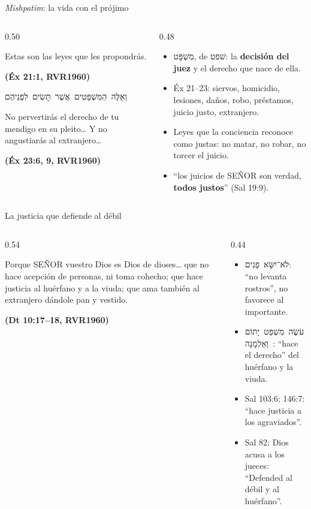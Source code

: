 \documentclass[hyperref={bookmarks=false},aspectratio=169]{beamer}
\newcommand{\heb}[1]{\mbox{\foreignlanguage{hebrew}{#1}}}
\newcommand{\SENOR}{S{\fontsize{0.78em}{1em}\selectfont EÑOR}}
\newcommand{\fuente}[1]{\par\hfill{\upshape\bfseries\footnotesize\textcolor{azul}{#1}}}
\newcommand{\destacar}[1]{\textbf{\textcolor{azul}{#1}}}
\begin{document}
\begin{frame}{\emph{Mishpatim}: la vida con el prójimo}
\begin{columns}[c,onlytextwidth]
\begin{column}{0.50\textwidth}
\begin{cita}Estas son las leyes que les propondrás.\fuente{(Éx 21:1, RVR1960)}\end{cita}
\begin{center}\heb{וְאֵלֶּה הַמִּשְׁפָּטִים אֲשֶׁר תָּשִׂים לִפְנֵיהֶם}\end{center}
\begin{cita}No pervertirás el derecho de tu mendigo en su pleito\ldots{} Y no angustiarás al extranjero\ldots\fuente{(Éx 23:6, 9, RVR1960)}\end{cita}
\end{column}
\begin{column}{0.48\textwidth}\small
\begin{itemize}
\item \heb{מִשְׁפָּט}, de \heb{שׁפט}: la \destacar{decisión del juez} y el derecho que nace de ella.
\item Éx 21--23: siervos, homicidio, lesiones, daños, robo, préstamos, juicio justo, extranjero.
\item Leyes que la conciencia reconoce como justas: no matar, no robar, no torcer el juicio.
\item ``los juicios de \SENOR{} son verdad, \destacar{todos justos}'' (Sal 19:9).
\end{itemize}
\end{column}
\end{columns}
\end{frame}

\begin{frame}{La justicia que defiende al débil}
\begin{columns}[c,onlytextwidth]
\begin{column}{0.54\textwidth}
\begin{cita}Porque \SENOR{} vuestro Dios es Dios de dioses\ldots{} que no hace acepción de personas, ni toma cohecho; que hace justicia al huérfano y a la viuda; que ama también al extranjero dándole pan y vestido.\fuente{(Dt 10:17--18, RVR1960)}\end{cita}
\end{column}
\begin{column}{0.44\textwidth}\scriptsize
\begin{itemize}
\item \heb{לֹא־יִשָּׂא פָנִים}: ``no levanta rostros'', no favorece al importante.
\item \heb{עֹשֶׂה מִשְׁפַּט יָתוֹם וְאַלְמָנָה}: ``hace el derecho'' del huérfano y la viuda.
\item Sal 103:6; 146:7: ``hace justicia a los agraviados''.
\item Sal 82: Dios acusa a los jueces: ``Defended al débil y al huérfano''.
\end{itemize}
\end{column}
\end{columns}
\end{frame}
\end{document}
